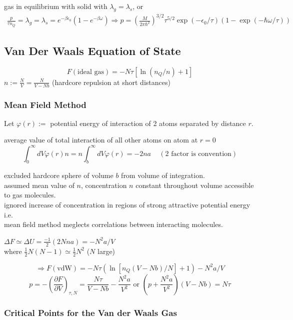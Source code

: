 \documentclass[twoside]{amsart}
\theoremstyle{plain}
\theoremstyle{definition}
\begin{document}
gas in equilibrium with solid with $\lambda_g = \lambda_s$, or 
\[
\begin{gathered}
  \frac{p}{ \tau n_Q} = \lambda_g = \lambda_s = e^{-\beta \epsilon_0} ( 1-  e^{-\beta \omega } ) \Longrightarrow p = \left( \frac{M}{ 2\pi \hbar^2 } \right)^{3/2} \tau^{5/2} \exp{ (-\epsilon_0/\tau) } (1- \exp{ ( -\hbar \omega / \tau ) } )
\end{gathered}
\]


\subsection*{Van Der Waals Equation of State}


\[
F(\text{ideal gas}) = -N\tau [ \ln{ (n_Q/n) } + 1 ]
\]
$n:= \frac{N}{V} = \frac{N}{V-Nb}$ (hardcore repulsion at short distances)

\subsubsection*{Mean Field Method}

Let $\varphi(r) := $ potential energy of interaction of 2 atoms separated by distance $r$.

average value of total interaction of all other atoms on atom at $r=0$
\[
\int_0^{\infty} dV \varphi(r)n = n \int_b^{\infty} dV \varphi(r) = -2na \quad \, (2 \text{ factor is convention})
\]

excluded hardcore sphere of volume $b$ from volume of integration. \\
assumed mean value of $n$, concentration $n$ constant throughout volume accessible to gas molecules. \\
\phantom{ \quad \, } ignored increase of concentration in regions of strong attractive potential energy i.e. \\
\phantom{ \quad \quad \, } mean field method meglects correlations between interacting molecules.

$\Delta F \simeq \Delta U = \frac{-1}{2} (2 N na) = -N^2 a/ V $ \\
\phantom{\quad \, } where $\frac{1}{2} N(N-1) \simeq \frac{1}{2} N^2 $ ($N$ large)

\[
\Longrightarrow F(\text{vdW}) = -N\tau ( \ln{ [n_Q (V-Nb)/N ]} + 1) - N^2 a /V
\]
\[
p = -\left( \frac{ \partial F}{ \partial V} \right)_{\tau,N} = \frac{N\tau}{ V-Nb} - \frac{N^2 a}{V^2} \text{ or } \left( p + \frac{N^2 a}{V^2} \right)(V-Nb) = N\tau
\]

\subsubsection*{Critical Points for the Van der Waals Gas}
\end{document}
